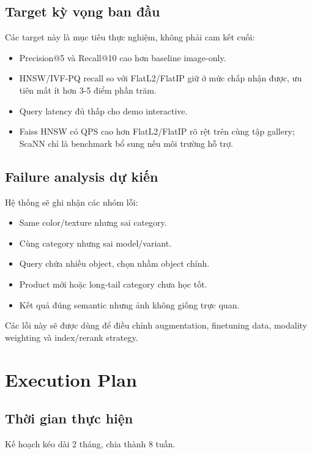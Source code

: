 \documentclass[12pt,a4paper]{article}
\begin{document}
\subsection{Target kỳ vọng ban đầu}
Các target này là mục tiêu thực nghiệm, không phải cam kết cuối:
\begin{itemize}
  \item Precision@5 và Recall@10 cao hơn baseline image-only.
  \item HNSW/IVF-PQ recall so với FlatL2/FlatIP giữ ở mức chấp nhận được, ưu tiên mất ít hơn 3-5 điểm phần trăm.
  \item Query latency đủ thấp cho demo interactive.
  \item Faiss HNSW có QPS cao hơn FlatL2/FlatIP rõ rệt trên cùng tập gallery; ScaNN chỉ là benchmark bổ sung nếu môi trường hỗ trợ.
\end{itemize}

\subsection{Failure analysis dự kiến}
Hệ thống sẽ ghi nhận các nhóm lỗi:
\begin{itemize}
  \item Same color/texture nhưng sai category.
  \item Cùng category nhưng sai model/variant.
  \item Query chứa nhiều object, chọn nhầm object chính.
  \item Product mới hoặc long-tail category chưa học tốt.
  \item Kết quả đúng semantic nhưng ảnh không giống trực quan.
\end{itemize}

Các lỗi này sẽ được dùng để điều chỉnh augmentation, finetuning data, modality weighting và index/rerank strategy.

\section{Execution Plan}

\subsection{Thời gian thực hiện}
Kế hoạch kéo dài 2 tháng, chia thành 8 tuần.
\end{document}
